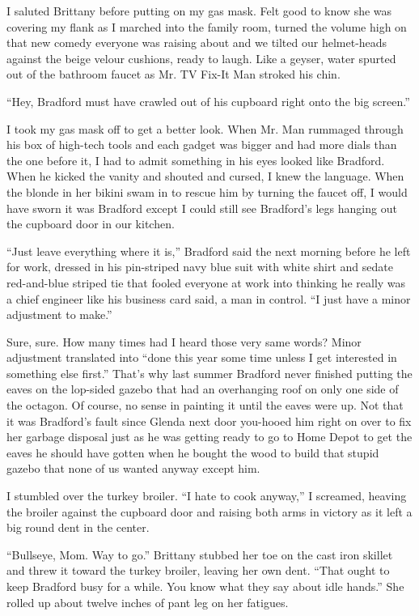 \documentclass[twoside,10pt]{book}
\begin{document}
I saluted Brittany before putting on my gas mask. Felt good to know she
was covering my flank as I marched into the family room, turned the
volume high on that new comedy everyone was raising about and we tilted
our helmet-heads against the beige velour cushions, ready to laugh. Like
a geyser, water spurted out of the bathroom faucet as Mr. TV Fix-It Man
stroked his chin.

``Hey, Bradford must have crawled out of his cupboard right onto the big
screen.''

I took my gas mask off to get a better look. When Mr. Man rummaged
through his box of high-tech tools and each gadget was bigger and had
more dials than the one before it, I had to admit something in his eyes
looked like Bradford. When he kicked the vanity and shouted and cursed,
I knew the language. When the blonde in her bikini swam in to rescue him
by turning the faucet off, I would have sworn it was Bradford except I
could still see Bradford's legs hanging out the cupboard door in our
kitchen.

``Just leave everything where it is,'' Bradford said the next morning
before he left for work, dressed in his pin-striped navy blue suit with
white shirt and sedate red-and-blue striped tie that fooled everyone at
work into thinking he really was a chief engineer like his business card
said, a man in con­trol. ``I just have a minor adjustment to make.''

Sure, sure. How many times had I heard those very same words? Minor
adjustment translated into ``done this year some time unless I get
interested in something else first.'' That's why last summer Bradford
never finished putting the eaves on the lop-sided gazebo that had an
overhanging roof on only one side of the octagon. Of course, no sense in
painting it until the eaves were up. Not that it was Bradford's fault
since Glenda next door you-hooed him right on over to fix her garbage
disposal just as he was getting ready to go to Home Depot to get the
eaves he should have gotten when he bought the wood to build that stupid
gazebo that none of us wanted anyway except him.

I stumbled over the turkey broiler. ``I hate to cook anyway,'' I
screamed, heaving the broiler against the cupboard door and raising both
arms in victory as it left a big round dent in the center.

``Bullseye, Mom. Way to go.'' Brittany stubbed her toe on the cast iron
skillet and threw it to­ward the turkey broiler, leaving her own dent.
``That ought to keep Bradford busy for a while. You know what they say
about idle hands.'' She rolled up about twelve inches of pant leg on her
fatigues.
\end{document}
